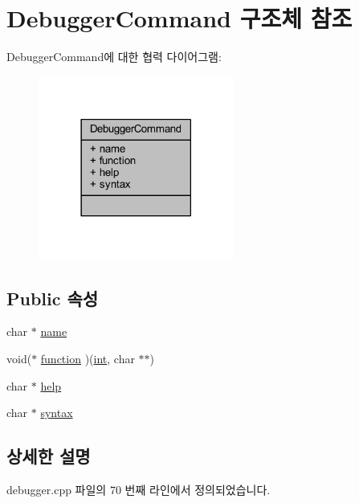\hypertarget{struct_debugger_command}{}\section{Debugger\+Command 구조체 참조}
\label{struct_debugger_command}


Debugger\+Command에 대한 협력 다이어그램\+:\nopagebreak
\begin{figure}[H]
\begin{center}
\leavevmode
\includegraphics[width=182pt]{struct_debugger_command__coll__graph}
\end{center}
\end{figure}
\subsection*{Public 속성}
\begin{DoxyCompactItemize}
\item 
char $\ast$ \mbox{\hyperlink{struct_debugger_command_a14e015150e5517ddf66877dff61190df}{name}}
\item 
void($\ast$ \mbox{\hyperlink{struct_debugger_command_a7dc1272eddb6304a1266dff8b4d99d18}{function}} )(\mbox{\hyperlink{_util_8cpp_a0ef32aa8672df19503a49fab2d0c8071}{int}}, char $\ast$$\ast$)
\item 
char $\ast$ \mbox{\hyperlink{struct_debugger_command_a23a8468dffa8e08b122db31ac3c11a4c}{help}}
\item 
char $\ast$ \mbox{\hyperlink{struct_debugger_command_aa127ebfc49b0d9b0837c4fd2329e0110}{syntax}}
\end{DoxyCompactItemize}


\subsection{상세한 설명}


debugger.\+cpp 파일의 70 번째 라인에서 정의되었습니다.



